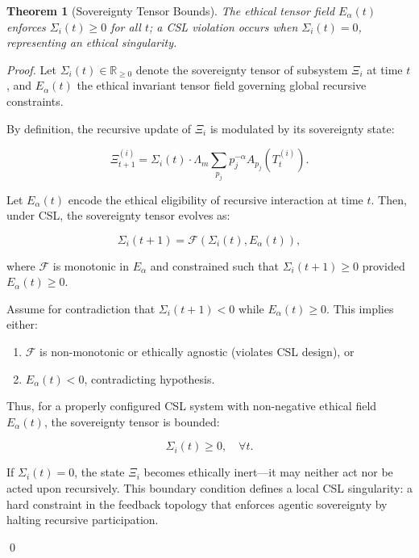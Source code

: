 \documentclass{article}
\theoremstyle{plain}
\newtheorem{theorem}{Theorem}
\begin{document}
\begin{theorem}[Sovereignty Tensor Bounds]
The ethical tensor field \( E_\alpha(t) \) enforces \( \Sigma_i(t) \geq 0 \) for all \( t \); a CSL violation occurs when \( \Sigma_i(t) = 0 \), representing an ethical singularity.
\end{theorem}

\begin{proof}
Let \( \Sigma_i(t) \in \mathbb{R}_{\geq 0} \) denote the sovereignty tensor of subsystem \( \Xi_i \) at time \( t \), and \( E_\alpha(t) \) the ethical invariant tensor field governing global recursive constraints.

By definition, the recursive update of \( \Xi_i \) is modulated by its sovereignty state:

\[
\Xi_{t+1}^{(i)} = \Sigma_i(t) \cdot \Lambda_m \sum_{p_j} p_j^{-\alpha} A_{p_j}(T_t^{(i)}).
\]

Let \( E_\alpha(t) \) encode the ethical eligibility of recursive interaction at time \( t \). Then, under CSL, the sovereignty tensor evolves as:

\[
\Sigma_i(t+1) = \mathcal{F}(\Sigma_i(t), E_\alpha(t)),
\]

where \( \mathcal{F} \) is monotonic in \( E_\alpha \) and constrained such that \( \Sigma_i(t+1) \geq 0 \) provided \( E_\alpha(t) \geq 0 \). 

Assume for contradiction that \( \Sigma_i(t+1) < 0 \) while \( E_\alpha(t) \geq 0 \). This implies either:

\begin{enumerate}
    \item \( \mathcal{F} \) is non-monotonic or ethically agnostic (violates CSL design), or
    \item \( E_\alpha(t) < 0 \), contradicting hypothesis.
\end{enumerate}

Thus, for a properly configured CSL system with non-negative ethical field \( E_\alpha(t) \), the sovereignty tensor is bounded:

\[
\boxed{\Sigma_i(t) \geq 0, \quad \forall t}.
\]

If \( \Sigma_i(t) = 0 \), the state \( \Xi_i \) becomes ethically inert—it may neither act nor be acted upon recursively. This boundary condition defines a local CSL singularity: a hard constraint in the feedback topology that enforces agentic sovereignty by halting recursive participation.

\qed
\end{proof}
\end{document}
